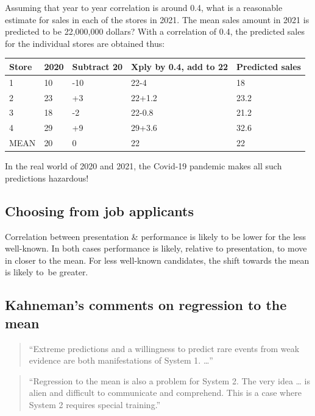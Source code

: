\documentclass[
  10pt,
  b5paper]{book}
\begin{document}
Assuming that year to year correlation is around 0.4,
what is a reasonable estimate for sales in each of the
stores in 2021. The mean sales amount in 2021 is predicted
to be 22,000,000 dollars? With a correlation of 0.4, the
predicted sales for the individual stores are obtained thus:

\begin{longtable}[]{@{}lllll@{}}
\toprule
Store & 2020 & Subtract 20 & Xply by 0.4, add to 22 & Predicted sales \\
\midrule
\endhead
1 & 10 & -10 & 22-4 & 18 \\
2 & 23 & +3 & 22+1.2 & 23.2 \\
3 & 18 & -2 & 22-0.8 & 21.2 \\
4 & 29 & +9 & 29+3.6 & 32.6 \\
MEAN & 20 & 0 & 22 & 22 \\
\bottomrule
\end{longtable}

In the real world of 2020 and 2021, the Covid-19 pandemic makes all such
predictions hazardous!

\hypertarget{choosing-from-job-applicants}{%
\subsection*{Choosing from job applicants}\label{choosing-from-job-applicants}}

Correlation between presentation \& performance is likely to
be lower for the less well-known. In both cases performance
is likely, relative to presentation, to move in closer to the
mean. For less well-known candidates, the shift towards the
mean is likely to~be greater.

\hypertarget{kahnemans-comments-on-regression-to-the-mean}{%
\subsection*{Kahneman's comments on regression to the mean}\label{kahnemans-comments-on-regression-to-the-mean}}

\begin{quote}
``Extreme predictions and a willingness to predict rare events from
weak evidence are both manifestations of System 1. \ldots{}''
\end{quote}

\begin{quote}
``Regression to the mean is also a problem for System 2. The very idea
\ldots{} is alien and difficult to communicate and comprehend. This is a
case where System 2 requires special training.''
\end{quote}
\end{document}
